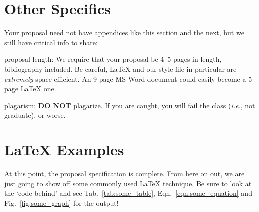 \documentclass{sig-alternate}
\begin{document}
\appendix
\section{Other Specifics}
\label{app:other_specifics}
Your proposal need not have appendices like this section and the next, but we still have critical info to share:

\begin{enumerate*}
	\item {\sc proposal length}: We require that your proposal be 4--5 pages in length, bibliography included. Be careful, \LaTeX{} and our style-file in particular are \textit{extremely} space efficient. An 9-page MS-Word document could easily become a 5-page \LaTeX{} one.\vspace{5pt}
	\item {\sc plagarism}: \textbf{DO NOT} plagarize. If you are caught, you will fail the class (\textit{i.e.}, not graduate), or worse. 
\end{enumerate*}

\section{\LaTeX{} Examples}
\label{app:latex_examples}

At this point, the proposal specification is complete. From here on out, we are just going to show off some commonly used \LaTeX{} technique. Be sure to look at the `code behind' and see Tab.~\ref{tab:some_table}, Eqn.~\ref{eqn:some_equation} and Fig.~\ref{fig:some_graph} for the output!

\end{document}
